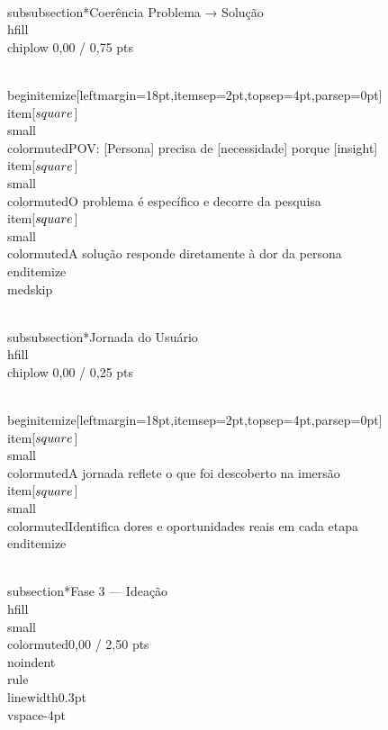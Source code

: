 \documentclass[11pt, a4paper]{article}
\newcommand{\chiplow}[1]{\colorbox{crimsondim}{\color{crimson}\semibold\small\strut\ #1\ }}
\begin{document}
\\subsubsection*{Coerência Problema → Solução \\hfill {\\chiplow 0,00 / 0,75 pts}}

\\begin{itemize}[leftmargin=18pt,itemsep=2pt,topsep=4pt,parsep=0pt]
  \\item[$\\square$] {\\small\\color{muted}POV: [Persona] precisa de [necessidade] porque [insight]}
  \\item[$\\square$] {\\small\\color{muted}O problema é específico e decorre da pesquisa}
  \\item[$\\square$] {\\small\\color{muted}A solução responde diretamente à dor da persona}
\\end{itemize}
\\medskip

\\subsubsection*{Jornada do Usuário \\hfill {\\chiplow 0,00 / 0,25 pts}}

\\begin{itemize}[leftmargin=18pt,itemsep=2pt,topsep=4pt,parsep=0pt]
  \\item[$\\square$] {\\small\\color{muted}A jornada reflete o que foi descoberto na imersão}
  \\item[$\\square$] {\\small\\color{muted}Identifica dores e oportunidades reais em cada etapa}
\\end{itemize}

\\subsection*{Fase 3 — Ideação \\hfill {\\small\\color{muted}0,00 / 2,50 pts}}
\\noindent\\rule{\\linewidth}{0.3pt}\\vspace{-4pt}
\end{document}
